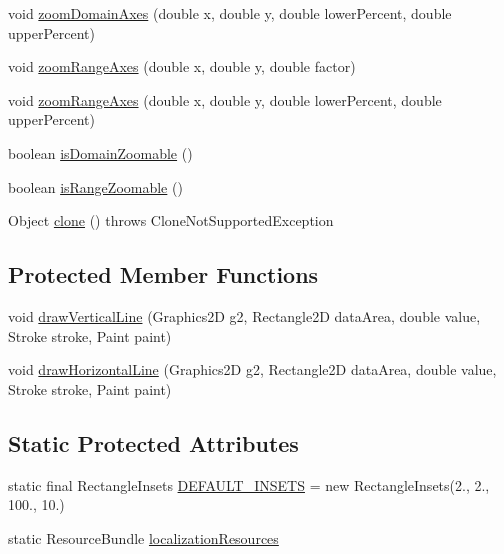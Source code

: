 \begin{DoxyCompactItemize}
\item 
void \mbox{\hyperlink{classorg_1_1jfree_1_1chart_1_1plot_1_1_contour_plot_a0af1f450bf64fcf0113b30a1fa599d57}{zoom\+Domain\+Axes}} (double x, double y, double lower\+Percent, double upper\+Percent)
\item 
void \mbox{\hyperlink{classorg_1_1jfree_1_1chart_1_1plot_1_1_contour_plot_a548c2b54129fd4c77d510dc531edda53}{zoom\+Range\+Axes}} (double x, double y, double factor)
\item 
void \mbox{\hyperlink{classorg_1_1jfree_1_1chart_1_1plot_1_1_contour_plot_a8dd8041bb5e9983cbec74cf439302620}{zoom\+Range\+Axes}} (double x, double y, double lower\+Percent, double upper\+Percent)
\item 
boolean \mbox{\hyperlink{classorg_1_1jfree_1_1chart_1_1plot_1_1_contour_plot_a4e8da768c581b1f0dd0c60f40e76343f}{is\+Domain\+Zoomable}} ()
\item 
boolean \mbox{\hyperlink{classorg_1_1jfree_1_1chart_1_1plot_1_1_contour_plot_aafa44a852a5c57661e64f833b7f2e9cf}{is\+Range\+Zoomable}} ()
\item 
Object \mbox{\hyperlink{classorg_1_1jfree_1_1chart_1_1plot_1_1_contour_plot_a790fc7461f02ecd923469848825397c2}{clone}} ()  throws Clone\+Not\+Supported\+Exception 
\end{DoxyCompactItemize}
\subsection*{Protected Member Functions}
\begin{DoxyCompactItemize}
\item 
void \mbox{\hyperlink{classorg_1_1jfree_1_1chart_1_1plot_1_1_contour_plot_a6497916dbe3ce94d34610abea83e0df2}{draw\+Vertical\+Line}} (Graphics2D g2, Rectangle2D data\+Area, double value, Stroke stroke, Paint paint)
\item 
void \mbox{\hyperlink{classorg_1_1jfree_1_1chart_1_1plot_1_1_contour_plot_af5c83cc72eb322deb9aa15ac0a087321}{draw\+Horizontal\+Line}} (Graphics2D g2, Rectangle2D data\+Area, double value, Stroke stroke, Paint paint)
\end{DoxyCompactItemize}
\subsection*{Static Protected Attributes}
\begin{DoxyCompactItemize}
\item 
static final Rectangle\+Insets \mbox{\hyperlink{classorg_1_1jfree_1_1chart_1_1plot_1_1_contour_plot_aa3cc13866ef34be456d54cff1364c3ef}{D\+E\+F\+A\+U\+L\+T\+\_\+\+I\+N\+S\+E\+TS}} = new Rectangle\+Insets(2., 2., 100., 10.)
\item 
static Resource\+Bundle \mbox{\hyperlink{classorg_1_1jfree_1_1chart_1_1plot_1_1_contour_plot_adb8ecde059da3f439f47c0eca5efc363}{localization\+Resources}}
\end{DoxyCompactItemize}
